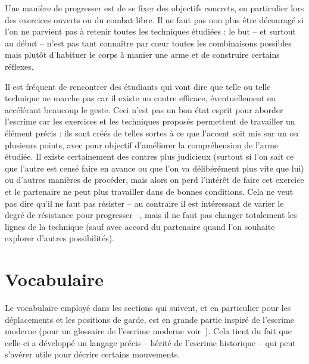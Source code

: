 
Une manière de progresser est de se fixer des objectifs concrets, en particulier lors des exercices ouverts ou du combat libre.
Il ne faut pas non plus être découragé si l'on ne parvient pas à retenir toutes les techniques étudiées : le but -- et surtout au début -- n'est pas tant connaître par cœur toutes les combinaisons possibles mais plutôt d'habituer le corps à manier une arme et de construire certains réflexes.

Il est fréquent de rencontrer des étudiants qui vont dire que telle ou telle technique ne marche pas car il existe un contre efficace, éventuellement en accélérant beaucoup le geste.
Ceci n'est pas un bon état esprit pour aborder l'escrime car les exercices et les techniques proposés permettent de travailler un élément précis : ils sont créés de telles sortes à ce que l'accent soit mis sur un ou plusieurs points, avec pour objectif d'améliorer la compréhension de l'arme étudiée.
Il existe certainement des contres plus judicieux (surtout si l'on sait ce que l'autre est censé faire en avance ou que l'on va délibérément plus vite que lui) ou d'autres manières de procéder, mais alors on perd l'intérêt de faire cet exercice et le partenaire ne peut plus travailler dans de bonnes conditions.
Cela ne veut pas dire qu'il ne faut pas résister – au contraire il est intéressant de varier le degré de résistance pour progresser –, mais il ne faut pas changer totalement les lignes de la technique (sauf avec accord du partenaire quand l'on souhaite explorer d'autres possibilités).


\section{Vocabulaire}


Le vocabulaire employé dans les sections qui suivent, et en particulier pour les déplacements et les positions de garde, est en grande partie inspiré de l'escrime moderne (pour un glossaire de l'escrime moderne voir~\cite{FIE:2014:BrefsGlossairesLescrime}).
Cela tient du fait que celle-ci a développé un langage précis -- hérité de l'escrime historique -- qui peut s'avérer utile pour décrire certains mouvements.
